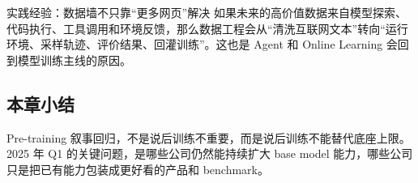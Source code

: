 \begin{importantbox}{实践经验：数据墙不只靠“更多网页”解决}
如果未来的高价值数据来自模型探索、代码执行、工具调用和环境反馈，那么数据工程会从“清洗互联网文本”转向“运行环境、采样轨迹、评价结果、回灌训练”。这也是 Agent 和 Online Learning 会回到模型训练主线的原因。
\end{importantbox}

\subsection{本章小结}

Pre-training 叙事回归，不是说后训练不重要，而是说后训练不能替代底座上限。2025 年 Q1 的关键问题，是哪些公司仍然能持续扩大 base model 能力，哪些公司只是把已有能力包装成更好看的产品和 benchmark。

